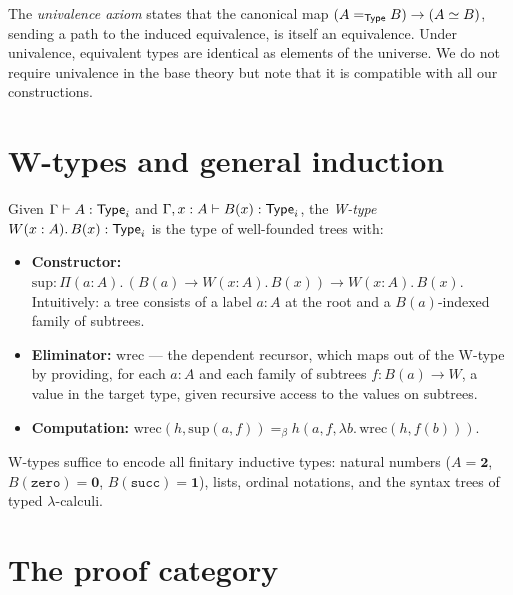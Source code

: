 \begin{remark}[Univalence]
The \emph{univalence axiom} states that the canonical map
$(A =_{\mathsf{Type}} B) \to (A \simeq B)$, sending a path to the induced
equivalence, is itself an equivalence.  Under univalence, equivalent
types are identical as elements of the universe.  We do not require
univalence in the base theory but note that it is compatible with all
our constructions.
\end{remark}

\section{W-types and general induction}
\label{sec:wtypes}

\begin{definition}[W-type]
\label{def:wtype}
Given $\Gamma \vdash A : \mathsf{Type}_i$ and
$\Gamma, x : A \vdash B(x) : \mathsf{Type}_i$, the \emph{W-type}
$W(x : A).\, B(x) : \mathsf{Type}_i$ is the type of well-founded trees with:
\begin{itemize}[nosep]
\item \textbf{Constructor:}
  $\mathrm{sup} : \Pi(a : A).\, (B(a) \to W(x:A).\, B(x))
  \to W(x:A).\, B(x)$.
  Intuitively: a tree consists of a label $a : A$ at the root and a
  $B(a)$-indexed family of subtrees.
\item \textbf{Eliminator:}
  $\mathrm{wrec}$ --- the dependent recursor, which maps out of the
  W-type by providing, for each $a : A$ and each family of subtrees
  $f : B(a) \to W$, a value in the target type, given recursive access
  to the values on subtrees.
\item \textbf{Computation:}
  $\mathrm{wrec}(h, \mathrm{sup}(a,f))
  =_\beta h(a, f, \lambda b.\, \mathrm{wrec}(h, f(b)))$.
\end{itemize}
\end{definition}

\begin{proposition}
W-types suffice to encode all finitary inductive types: natural
numbers ($A = \mathbf{2}$, $B(\mathtt{zero}) = \mathbf{0}$,
$B(\mathtt{succ}) = \mathbf{1}$), lists, ordinal notations, and the
syntax trees of typed $\lambda$-calculi.
\end{proposition}

\section{The proof category}
\label{sec:proof-category}

